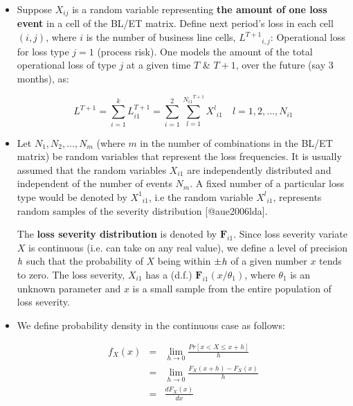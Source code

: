 \documentclass[]{DissertateUSU}
\begin{document}
\begin{itemize}
\item Suppose $X_{ij}$ is a random variable representing \textbf{the amount of one loss event} in a cell of the BL/ET matrix. Define next period's loss in each cell $(i,j)$, where $i$ is the number of business line cells, \begin{math} {{L}^{T+1}}_{i,j}\end{math}: Operational loss for loss type $j=1$ (process risk). One models the amount of the total operational loss of type $j$ at a given time $T$ \& $T + 1$, over the future (say 3 months), as:

\singlespacing
\begin{equation}\label{eqn5}
{L}^{T+1}=\sum_{i=1}^{k}{L}^{T+1}_{i1}=\sum_{i=1}^{2}\sum_{l=1}^{{{N}_{i1}}^{T+1}}{{X}^{l}}_{i1} \quad l=1,2,\ldots, N_{i1} 
\end{equation}
\doublespacing

\item Let $ N_1, N_2,...,N_m $ (where $m$ in the number of combinations in the BL/ET matrix) be random variables that represent the loss frequencies. It is usually assumed that the random variables $X_{i1}$ are independently distributed and independent of the number of events $N_{m}$. A fixed number of a particular loss type would be denoted by ${{X}^{1}}_{i1}$, i.e the random variable \begin{math}{{X}^{l}}_{i1}\end{math}, represents random samples of the severity distribution [@aue2006lda].\medskip

The \textbf{loss severity distribution} is denoted by \begin{math}\mathbf{F}_{i1}\end{math}. Since loss severity variate $X$ is continuous (i.e. can take on any real value), we define a level of precision $\emph{h}$ such that the probability of $X$ being within $\pm\emph{h}$ of a given number $x$ tends to zero. The loss severity, $X_{i1}$ has a (d.f.) \begin{math}\mathbf{F}_{i1}(x/\theta_1) \end{math}, where $\theta_1$ is an unknown parameter and $x$ is a small sample from the entire population of loss severity.

\item We define probability density in the continuous case as follows:

\singlespacing
\begin{eqnarray}
f_{X}(x) &=& \lim_{h\rightarrow 0}\frac{Pr[x < X \leq x + h]}{h}\nonumber\\
&=& \lim_{h\rightarrow 0}\frac{F_{X}(x + h) - F_{X}(x)}{h}\nonumber\\
&=&\frac{dF_{X}(x)}{dx} \label{eqn6a}
\end{eqnarray}
\doublespacing


\end{itemize}
\end{document}
